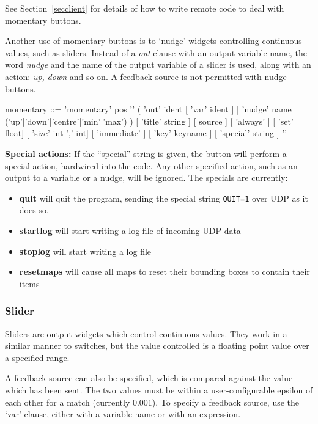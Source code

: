 See Section~\ref{secclient} for details of how to write remote
code to deal with momentary buttons.

Another use of momentary buttons is to `nudge' widgets controlling continuous
values, such as sliders. Instead of a \emph{out} clause with an output
variable name, the word \emph{nudge} and the name of the output variable of a
slider is used, along with an action: \emph{up,} \emph{down} and so on. A
feedback source is not permitted with nudge buttons.
\begin{v}
momentary  ::= 'momentary' pos '{'
                    ( 'out' ident [ 'var' ident ] |
                      'nudge' name ('up'|'down'|'centre'|'min'|'max') )
                    [ 'title' string ]
                    [ source ]
                    [ 'always' ]
                    [ 'set' float]
                    [ 'size' int ',' int]
                    [ 'immediate' ]
                    [ 'key' keyname ]
                    [ 'special' string ]
                '}'
\end{v}


\textbf{Special actions:} If the ``special'' string is given, the button will
perform a special action, hardwired into the code. Any other specified action,
such as an output to a variable or a nudge, will be ignored. The specials are
currently:
\begin{itemize}
\item \textbf{quit} will quit the program, sending the special string
\texttt{QUIT=1} over UDP as it does so.
\item \textbf{startlog} will start writing a log file of incoming UDP data
\item \textbf{stoplog} will start writing a log file
\item \textbf{resetmaps} will cause all maps to reset their bounding boxes to contain their items
\end{itemize}


\subsubsection{Slider}
Sliders are output widgets which control continuous values. They
work in a similar manner to switches, but the value controlled
is a floating point value over a specified range.

A feedback source can also be specified, which is compared against
the value which has been sent. The two values must be within
a user-configurable epsilon of each other for a match (currently 0.001).
To specify a feedback source, use the `var' clause, either with a variable name
or with an expression.

